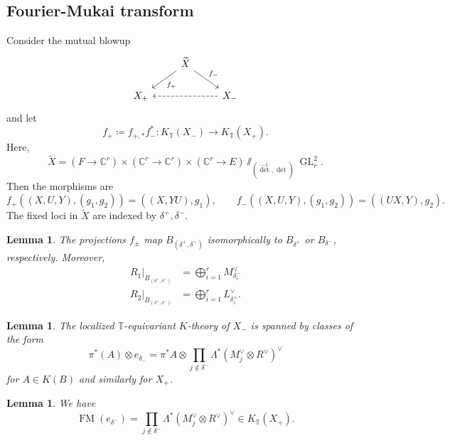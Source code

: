 \documentclass[leqno, openany]{memoir}
\newtheorem{lem}[thm]{Lemma}
\theoremstyle{definition}
\theoremstyle{remark}
\theoremstyle{plain}
\theoremstyle{definition}
\theoremstyle{remark}
\newcommand{\C}{\mathbb{C}}
\newcommand{\T}{\mathbb{T}}
\newcommand{\on}[1]{\operatorname{#1}}
\newcommand{\wt}[1]{\widetilde{#1}}
\DeclareMathOperator{\GL}{GL}
\begin{document}
\subsection{Fourier-Mukai transform}%
\label{sub:Fourier-Mukai transform}

Consider the mutual blowup
\begin{equation*}
\begin{tikzcd}
    & \wt{X} \ar{dl}{f_+} \ar{dr}{f_-} \\
    X_+ & & X_- \ar[dashrightarrow]{ll}
\end{tikzcd}
\end{equation*}
and let
\[ f_+ \coloneqq f_{+,*} f_-^* \colon K_{\T}(X_-) \to K_{\T}(X_+). \]
Here,
\[ \wt{X} = (F \to \C^r) \times (\C^r \to \C^r) \times (\C^r \to E) \sslash_{(\det^{-1},\det)} \GL_r^2. \]
Then the morphisms are
\[ f_+((X,U,Y), (g_1,g_2)) = ((X,YU), g_1), \qquad f_-((X,U,Y), (g_1, g_2)) = ((UX, Y), g_2). \]
The fixed loci in $\wt{X}$ are indexed by $\delta^+, \delta^-$. 

\begin{lem}
    The projections $f_{\pm}$ map $B_{(\delta^+, \delta^-)}$ isomorphically to $B_{\delta^+}$ or $B_{\delta^-}$, respectively. Moreover,
    \begin{align*}
        R_1|_{B_{(\delta^+, \delta^-)}} &= \bigoplus_{i=1}^r M_{\delta^-_i}^{\vee} \\
        R_2|_{B_{( \delta^+,\delta^- )}} &= \bigoplus_{i=1}^r L_{\delta^+_i}^{\vee}.
    \end{align*}
\end{lem}

\begin{lem}
    The localized $\T$-equivariant $K$-theory of $X_-$ is spanned by classes of the form
    \[ \pi^*(A) \otimes e_{\delta_-} = \pi^* A \otimes \prod_{j \notin \delta^-} \Lambda^*(M_j^{\vee} \otimes R^{\vee})^{\vee} \]
    for $A \in K(B)$ and similarly for $X_+$.
\end{lem}

\begin{lem}
    We have
    \[ \on{FM}(e_{\delta^-}) = \prod_{j \notin \delta^-} \Lambda^*(M_j^{\vee} \otimes R^{\vee})^{\vee} \in K_{\T}(X_+). \]
\end{lem}
\end{document}
